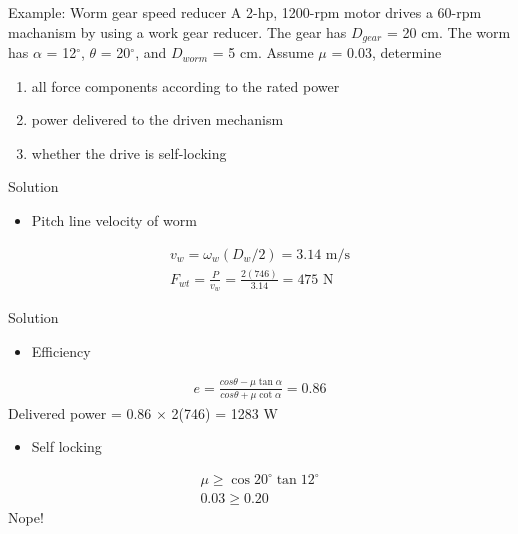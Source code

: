 \documentclass[
10pt,
a4paper,
openany,
svgnames,
]{book}
\begin{document}

\begin{frame}{Example: Worm gear speed reducer}
  A 2-hp, 1200-rpm motor drives a 60-rpm machanism by using a work gear reducer. The gear has $D_{gear}$ = 20 cm. The worm has $\alpha$ = 12$^{\circ}$, $\theta$ = 20$^{\circ}$, and $D_{worm}$ = 5 cm. Assume $\mu$ = 0.03, determine
  \begin{enumerate}
    \item all force components according to the rated power
    \item power delivered to the driven mechanism
    \item whether the drive is self-locking
  \end{enumerate}
\end{frame}

\begin{frame}{Solution}
  \begin{itemize}
    \item Pitch line velocity of worm
  \end{itemize}
  \begin{align*}
    v_{w} = \omega_{w} (D_{w}/2) = 3.14 \text{ m/s} \\
    F_{wt} = \frac{P}{v_{w}} = \frac{2(746)}{3.14} = 475 \text{ N}
  \end{align*}
\end{frame}

\begin{frame}{Solution}
  \begin{itemize}
    \item Efficiency
  \end{itemize}
  \begin{align*}
    e = \frac{cos \theta - \mu \tan \alpha}{cos \theta + \mu \cot \alpha} = 0.86
  \end{align*}
  Delivered power = 0.86 $\times$ 2(746) = 1283 W

  \begin{itemize}
    \item Self locking
  \end{itemize}
  \begin{align*}
    \mu \geqslant \cos 20^{\circ} \tan 12^{\circ} \\
    0.03 \geqslant 0.20
  \end{align*}
Nope!
\end{frame}
\end{document}
